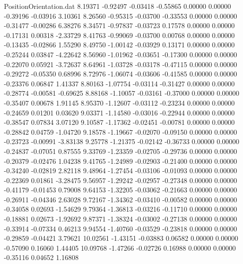 \begin{filecontents}{PositionOrientation.dat}
   8.19371   -0.92497   -0.03418    -0.55865    0.00000    0.00000   -0.39196   -0.03916    3.10361
   8.26560   -0.95315   -0.03700    -0.33553    0.00000    0.00000   -0.31477   -0.00286    6.38276
   8.34571   -0.97837   -0.03723     0.17578    0.00000    0.00000   -0.17131    0.00318   -2.33729
   8.41763   -0.99069   -0.03700     0.00768    0.00000    0.00000   -0.13435   -0.02866    1.55290
   8.49750   -1.00142   -0.03929     0.13171    0.00000    0.00000   -0.25244    0.03847   -4.22642
   8.56960   -1.01962   -0.03651    -0.17300    0.00000    0.00000   -0.22070    0.05921   -3.72637
   8.64961   -1.03728   -0.03178    -0.47115    0.00000    0.00000   -0.29272   -0.05350    0.68996
   8.72976   -1.06074   -0.03606    -0.41585    0.00000    0.00000   -0.23376    0.06847    1.41337
   8.80163   -1.07754   -0.03114    -0.31427    0.00000    0.00000   -0.28774   -0.00581   -0.69625
   8.88168   -1.10057   -0.03161    -0.37000    0.00000    0.00000   -0.35407    0.00678    1.91145
   8.95370   -1.12607   -0.03112    -0.23234    0.00000    0.00000   -0.24659    0.01201    0.03620
   9.03371   -1.14580   -0.03016    -0.22944    0.00000    0.00000   -0.38547    0.07834    3.07120
   9.10587   -1.17362   -0.02451    -0.00781    0.00000    0.00000   -0.28842    0.04759   -1.04720
   9.18578   -1.19667   -0.02070    -0.09150    0.00000    0.00000   -0.23723   -0.00991   -3.83138
   9.25778   -1.21375   -0.02142    -0.36733    0.00000    0.00000   -0.24837   -0.07051    0.87555
   9.33769   -1.23359   -0.02705    -0.29736    0.00000    0.00000   -0.20379   -0.02476    1.04238
   9.41765   -1.24989   -0.02903    -0.21400    0.00000    0.00000   -0.34240   -0.02819    2.82118
   9.48964   -1.27454   -0.03106    -0.01093    0.00000    0.00000   -0.22369    0.01861   -3.28475
   9.56957   -1.29242   -0.02957    -0.27348    0.00000    0.00000   -0.41179   -0.01453    0.79008
   9.64153   -1.32205   -0.03062    -0.21663    0.00000    0.00000   -0.26911   -0.04346    2.63028
   9.72167   -1.34362   -0.03410    -0.00582    0.00000    0.00000   -0.34058    0.02693   -1.54629
   9.79364   -1.36813   -0.03216    -0.11710    0.00000    0.00000   -0.18881    0.02673   -1.92692
   9.87371   -1.38324   -0.03002    -0.27138    0.00000    0.00000   -0.33914   -0.07334    0.46213
   9.94554   -1.40760   -0.03529    -0.23818    0.00000    0.00000   -0.29859   -0.04421    3.79621
  10.02561   -1.43151   -0.03883     0.06582    0.00000    0.00000   -0.57090    0.16060    1.44405
  10.09768   -1.47266   -0.02726     0.16988    0.00000    0.00000   -0.35116    0.04652    1.16808

\end{filecontents}
